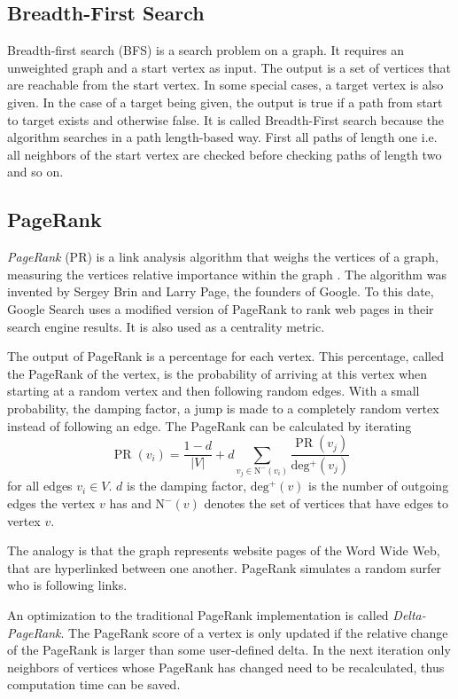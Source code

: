 \subsection{Breadth-First Search}
Breadth-first search (BFS) is a search problem on a graph.
It requires an unweighted graph and a start vertex as input.
The output is a set of vertices that are reachable from the start vertex.
In some special cases, a target vertex is also given. In the case of a target being given, the output is true if a path from start to target exists and otherwise false.
It is called Breadth-First search because the algorithm searches in a path length-based way. First all paths of length one i.e. all neighbors of the start vertex are checked before checking paths of length two and so on.

\subsection{PageRank}
\emph{PageRank} (PR) is a link analysis algorithm that weighs the vertices of a graph, measuring the vertices relative importance within the graph \cite{pagerank}.
The algorithm was invented by Sergey Brin and Larry Page, the founders of Google. To this date, Google Search uses a modified version of PageRank to rank web pages in their search engine results.
It is also used as a centrality metric.

The output of PageRank is a percentage for each vertex. This percentage, called the PageRank of the vertex, is the probability of arriving at this vertex when starting at a random vertex and then following random edges.
With a small probability, the damping factor, a jump is made to a completely random vertex instead of following an edge.
The PageRank can be calculated by iterating
\begin{equation*}
	\operatorname{PR}(v_i) = \frac{1 - d}{|V|} + d \sum_{v_j \in \operatorname{N^-}(v_i)} \frac{\operatorname{PR}(v_j)}{\operatorname{deg^+}(v_j)}
\end{equation*}
for all edges $v_i \in V$.
$d$ is the damping factor, $\operatorname{deg^+}(v)$ is the number of outgoing edges the vertex $v$ has and $\operatorname{N^-}(v)$ denotes the set of vertices that have edges to vertex $v$.

The analogy is that the graph represents website pages of the Word Wide Web, that are hyperlinked between one another.
PageRank simulates a random surfer who is following links.

An optimization to the traditional PageRank implementation is called \emph{Delta-PageRank}.
The PageRank score of a vertex is only updated if the relative change of the PageRank is larger than some user-defined delta.
In the next iteration only neighbors of vertices whose PageRank has changed need to be recalculated, thus computation time can be saved.

